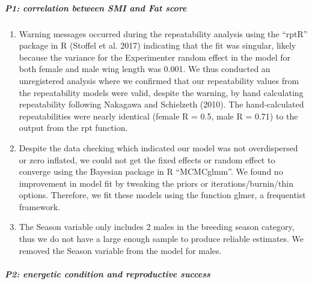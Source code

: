 \documentclass[
]{article}
\begin{document}
\hypertarget{p1-correlation-between-smi-and-fat-score}{%
\subparagraph{P1: correlation between SMI and Fat
score}\label{p1-correlation-between-smi-and-fat-score}}

\begin{enumerate}
\def\labelenumi{\arabic{enumi})}
\setcounter{enumi}{2}
\item
  Warning messages occurred during the repeatability analysis using the
  ``rptR'' package in R (Stoffel et al. 2017) indicating that the fit
  was singular, likely because the variance for the Experimenter random
  effect in the model for both female and male wing length was 0.001. We
  thus conducted an unregistered analysis where we confirmed that our
  repeatability values from the repeatability models were valid, despite
  the warning, by hand calculating repeatability following Nakagawa and
  Schielzeth (2010). The hand-calculated repeatabilities were nearly
  identical (female R = 0.5, male R = 0.71) to the output from the rpt
  function.
\item
  Despite the data checking which indicated our model was not
  overdispersed or zero inflated, we could not get the fixed effects or
  random effect to converge using the Bayesian package in R
  ``MCMCglmm''. We found no improvement in model fit by tweaking the
  priors or iterations/burnin/thin options. Therefore, we fit these
  models using the function glmer, a frequentist framework.
\item
  The Season variable only includes 2 males in the breeding season
  category, thus we do not have a large enough sample to produce
  reliable estimates. We removed the Season variable from the model for
  males.
\end{enumerate}

\hypertarget{p2-energetic-condition-and-reproductive-success}{%
\subparagraph{P2: energetic condition and reproductive
success}\label{p2-energetic-condition-and-reproductive-success}}
\end{document}
